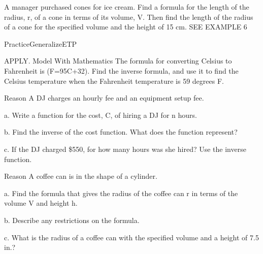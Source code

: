 \documentclass{article}
\newenvironment{practice}[2]{}{}        %
\newenvironment{te-addendum}[2]{}{}     %
\newcommand{\answer}[1]{}               %
\newcommand{\placeholder}[2]{}          %
\newcommand{\te}[1]{}                   %
\begin{document}
\begin{practice}{32}{2}
A manager purchased cones for ice cream. Find a formula for the length of the radius, r, of a cone in terms of its volume, V. Then find the length of the radius of a cone for the specified volume and the height of 15 cm. SEE EXAMPLE 6
\placeholder{illustration}{Ice cream stand at beach with red ICE CREAM sign, striped awning, cone pictures, surfboards and cone logo. Callout: V of cone = 290 pi cubic centimeters.}
\answer{See back of book.}
\end{practice}
\begin{te-addendum}{Practice}{GeneralizeETP}
\te{Practice \& Problem Solving is available at SavvasRealize.com. Answers for 15--19 and 33 appear on this page and are transcribed with their items.}
\end{te-addendum}
\begin{practice}{33}{2}
APPLY. Model With Mathematics The formula for converting Celsius to Fahrenheit is (F=\frac95C+32). Find the inverse formula, and use it to find the Celsius temperature when the Fahrenheit temperature is 59 degrees F.
\answer{(C=\frac59(F-32)); 15 degrees C}
\end{practice}
\begin{practice}{34}{2}
Reason A DJ charges an hourly fee and an equipment setup fee.
\placeholder{illustration}{DJ FOR HIRE advertisement: woman wearing headphones at turntables, crowd silhouettes, purple/pink background. RATES 75 dollars an hour, 100 dollars set up. CONTACT US.}
a. Write a function for the cost, C, of hiring a DJ for n hours.
\answer{a. (C=75n+100)}
b. Find the inverse of the cost function. What does the function represent?
\answer{b. (n=\frac{C-100}{75}); The inverse represents the number of hours the DJ is hired in terms of the cost.}
c. If the DJ charged \$550, for how many hours was she hired? Use the inverse function.
\answer{c. 6 h}
\end{practice}
\begin{practice}{35}{2}
Reason A coffee can is in the shape of a cylinder.
\placeholder{diagram}{Cylindrical can labeled Coffee with coffee-bean illustration. Vertical red dimension arrow on left: 7.5 in. Callout on right: Volume: V=67.5 pi cubic inches.}
a. Find the formula that gives the radius of the coffee can r in terms of the volume V and height h.
\answer{a. (r=\sqrt{\frac V{\pi h}})}
b. Describe any restrictions on the formula.
\answer{b. (h>0) and (V>0) because division by 0 is not possible and the height and volume of a coffee can cannot be negative.}
c. What is the radius of a coffee can with the specified volume and a height of 7.5 in.?
\answer{c. 3 in.}
\end{practice}
\end{document}
